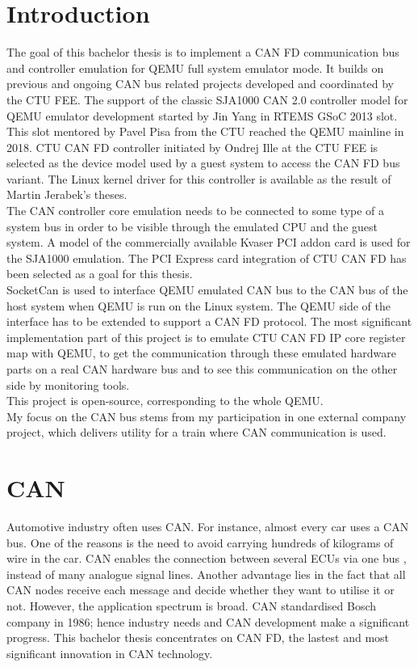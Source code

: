 \documentclass{ctuthesis}
\begin{document}
\chapter{Introduction}
 The goal of this bachelor thesis is to implement a CAN FD communication bus and controller emulation for QEMU full system emulator mode. It builds on previous and ongoing CAN bus related projects developed and coordinated by the CTU FEE. The support of the classic SJA1000 CAN 2.0 controller model for QEMU emulator development started by Jin Yang in RTEMS GSoC 2013 slot. This slot mentored by Pavel Pisa from the CTU reached the QEMU mainline in 2018. \cite{qemu-mainline} CTU CAN FD controller \cite{ctu-canfd-core} initiated by Ondrej Ille at the CTU FEE is selected as the device model used by a guest system to access the CAN FD bus variant. The Linux kernel driver for this controller is available as the result of Martin Jerabek's theses. \cite{ctu-canfd} \\
 The CAN controller core emulation needs to be connected to some type of a system bus in order to be visible through the emulated CPU and the guest system. A model of the commercially available Kvaser PCI addon card is used for the SJA1000 emulation. The PCI Express card integration of CTU CAN FD \cite{ctu-project} has been selected as a goal for this thesis. \\
 SocketCan is used to interface QEMU emulated CAN bus to the CAN bus of the host system when QEMU is run on the Linux system. The QEMU side of the interface has to be extended to support a CAN FD protocol.
The most significant implementation part of this project is to emulate CTU CAN FD IP core register map \cite{progdum} with QEMU, to get the communication through these emulated hardware parts on a real CAN hardware bus and to see this communication on the other side by monitoring tools. \\
This project is open-source, corresponding to the whole QEMU. \\
My focus on the CAN bus stems from my participation in one external company project, which delivers utility for a train where CAN communication is used.

\chapter{CAN}
 Automotive industry often uses CAN.  For instance, almost every car uses a CAN bus. One of the reasons is the need to avoid carrying hundreds of kilograms of wire in the car. CAN enables the connection between several ECUs via one bus \cite{ECUs} , instead of many analogue signal lines. Another advantage lies in the fact that all CAN nodes receive each message and decide whether they want to utilise it or not. However, the application spectrum is broad. CAN standardised Bosch company in 1986; hence industry needs and CAN development make a significant progress. This bachelor thesis concentrates on CAN FD, the lastest and most significant innovation in CAN technology.
\end{document}
